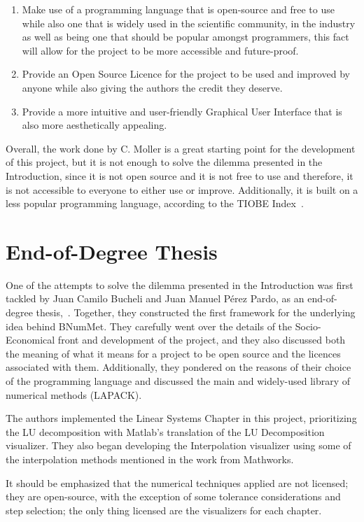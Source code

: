 \begin{enumerate}
    \item Make use of a programming language that is open-source and free to use while also one that is widely used in the scientific community, in the industry as well as being one that should be popular amongst programmers, this fact will allow for the project to be more accessible and future-proof.
    \item Provide an Open Source Licence for the project to be used and improved by anyone while also giving the authors the credit they deserve.
    \item Provide a more intuitive and user-friendly Graphical User Interface that is also more aesthetically appealing.
\end{enumerate}


Overall, the work done by C. Moller is a great starting point for the development of this project, but it is not enough to solve the dilemma presented in the Introduction, since it is not open source and it is not free to use and therefore, it is not accessible to everyone to either use or improve. Additionally, it is built on a less popular programming language, according to the TIOBE Index~\cite{tiobe}.


\section{End-of-Degree Thesis}
One of the attempts to solve the dilemma presented in the Introduction was first tackled by Juan Camilo Bucheli and Juan Manuel Pérez Pardo, as an end-of-degree thesis,~\cite{bucheli2020}. Together, they constructed the first framework for the underlying idea behind BNumMet.
They carefully went over the details of the Socio-Economical front and development of the project, and they also discussed both the meaning of what it means for a project to be open source and the licences associated with them. Additionally, they pondered on the reasons of their choice of the programming language and discussed the main and widely-used library of numerical methods (LAPACK).

The authors implemented the Linear Systems Chapter in this project, prioritizing the LU decomposition with Matlab's translation of the LU Decomposition visualizer. They also began developing the Interpolation visualizer using some of the interpolation methods mentioned in the work from Mathworks.

It should be emphasized that the numerical techniques applied are not licensed; they are open-source, with the exception of some tolerance considerations and step selection; the only thing licensed are the visualizers for each chapter.


